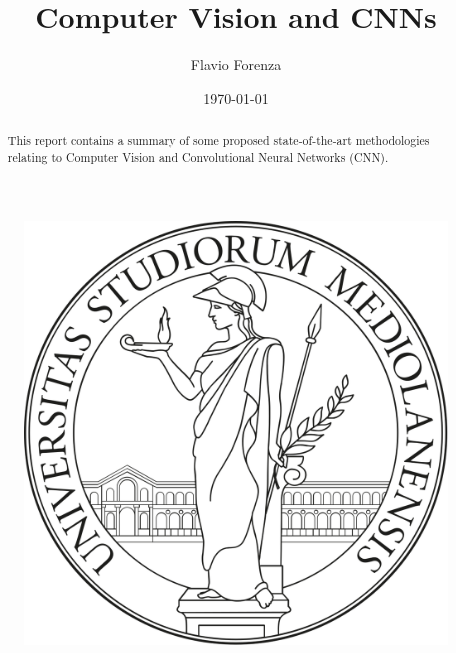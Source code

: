 \documentclass[letterpaper,12pt]{article}
\begin{document}
    
\title{\bfseries{Computer Vision and CNNs}}
\author{Flavio Forenza}
\date\today
\maketitle

\begin{figure}[h!]
  \centering
  \includegraphics[width=0.2\linewidth]{images/logoUnimi2.png}
  \centering
\end{figure}

\begin{abstract}
    This report contains a summary of some proposed state-of-the-art 
    methodologies relating to Computer Vision and Convolutional Neural 
    Networks (CNN).
\end{abstract}



%

%

%

%

%

%

%

%

%

\newpage


\newpage


\end{document}
